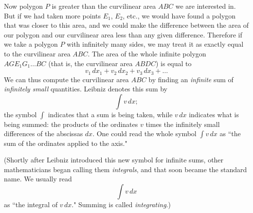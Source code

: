 \documentclass[twoside,openright]{article}
\begin{document}
Now polygon $P$ is greater than the curvilinear area $ABC$ we are
interested in.  But if we had taken more points $E_1$, $E_2$, etc., we
would have found a polygon that was closer to this area, and we could
make the difference between the area of our polygon and our
curvilinear area less than any given difference.  Therefore if we take
a polygon $P$ with infinitely many sides, we may treat it as exactly
equal to the curvilinear area $ABC$.  The area of the whole infinite
polygon $AGE_1G_1\ldots BC$ (that is, the curvilinear area $ABDC$) is
equal to
$$v_1\,dx_1 + v_2\,dx_2 + v_3\,dx_3 + \ldots$$
We can thus compute the curvilinear area $ABC$ by finding an {\em
  infinite} sum of {\em infinitely small} quantities.  Leibniz denotes
this sum by
$$\int\!v\,dx;$$
the symbol $\int$ indicates that a sum is being taken, while $v\,dx$
indicates what is being summed: the products of the ordinates $v$
times the infinitely small differences of the abscissas $dx$.  One
could read the whole symbol $\int\!v\,dx$ as ``the sum of the
ordinates applied to the axis."

(Shortly after Leibniz introduced this new symbol for infinite sums,
other mathematicians began calling them {\em integrals}, and that soon
became the standard name.  We usually read
$$\int\!v\,dx$$
as ``the integral of $v\,dx$."  Summing is called {\em integrating}.)

\end{document}
